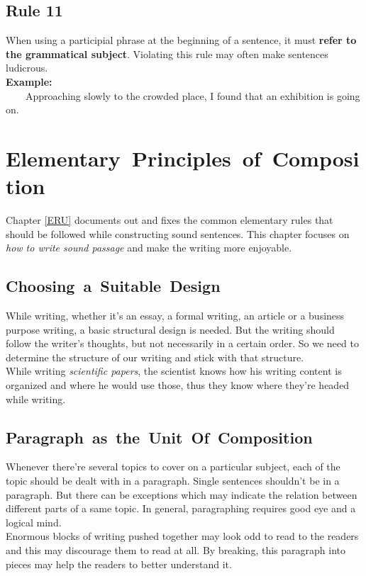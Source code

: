 \documentclass[12pt]{report}
\newcommand{\xmpl}{\textbf{Example:}\\} %
\newcommand{\indnt}{\ \ \ \ } %
\begin{document}
\section{Rule 11}\label{rl11}
When using a participial phrase at the beginning of a sentence, it must \textbf{refer to the grammatical subject}. Violating this rule may often make sentences ludicrous.\\
\xmpl
\indnt Approaching slowly to the crowded place, I found that an exhibition is going on.




\chapter{\mbox{Elementary Principles of Composition}}
Chapter \ref{ERU} documents out and fixes the common elementary rules that should be followed while constructing sound sentences. This chapter focuses on \emph{how to write sound passage} and make the writing more enjoyable.


\section{\mbox{Choosing a Suitable Design}} \label{CSD}
While writing, whether it's an essay, a formal writing, an article or a business purpose writing, a basic structural design is needed. But the writing should follow the writer's thoughts, but not necessarily in a certain order. So we need to determine the structure of our writing and stick with that structure.\\
While writing \emph{scientific papers}, the scientist knows how his writing content is organized and where he would use those, thus they know where they're headed while writing.


\section{\mbox{Paragraph as the Unit Of Composition}}
Whenever there're several topics to cover on a particular subject, each of the topic should be dealt with in a paragraph. Single sentences shouldn't be in a paragraph. But there can be exceptions which may indicate the relation between different parts of a same topic. In general, paragraphing requires good eye and a logical mind.\\
Enormous blocks of writing pushed together may look odd to read to the readers and this may discourage them to read at all. By breaking, this paragraph into pieces may help the readers to better understand it.
\end{document}
